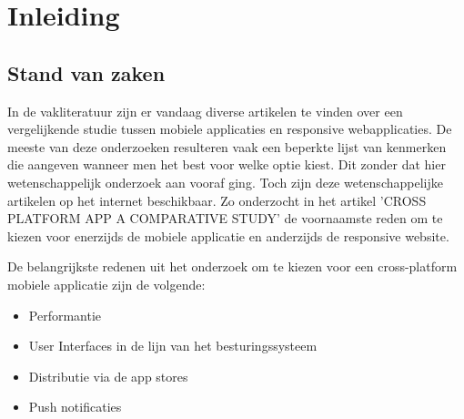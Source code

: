 

\chapter{Inleiding}
\label{ch:inleiding}



\section{Stand van zaken}
\label{sec:stand-van-zaken}

In de vakliteratuur zijn er vandaag diverse artikelen te vinden over een vergelijkende studie tussen mobiele applicaties
en responsive webapplicaties. De meeste van deze onderzoeken resulteren vaak een beperkte lijst van kenmerken die aangeven wanneer men het best voor welke optie kiest.
Dit zonder dat hier wetenschappelijk onderzoek aan vooraf ging. Toch zijn deze wetenschappelijke artikelen op het internet beschikbaar. Zo onderzocht \cite{albuquerque2015}
in het artikel 'CROSS PLATFORM APP A COMPARATIVE STUDY' de voornaamste reden om te kiezen voor enerzijds de mobiele
applicatie en anderzijds de responsive website.

De belangrijkste redenen uit het onderzoek om te kiezen voor een cross-platform mobiele applicatie zijn de volgende:
\begin{itemize}
  \item{Performantie}
  \item{User Interfaces in de lijn van het besturingssysteem}
  \item{Distributie via de app stores}
  \item{Push notificaties}
\end{itemize}

